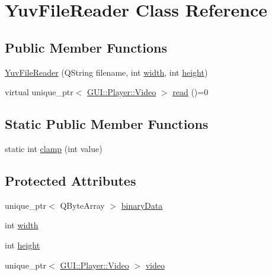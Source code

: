 \hypertarget{classUtility_1_1YuvFileReader}{}\section{Yuv\+File\+Reader Class Reference}
\label{classUtility_1_1YuvFileReader}
\subsection*{Public Member Functions}
\begin{DoxyCompactItemize}
\item 
\hyperlink{classUtility_1_1YuvFileReader_a4d1117a96eef85d154a837df5779e21a}{Yuv\+File\+Reader} (Q\+String filename, int \hyperlink{classUtility_1_1YuvFileReader_a2474a5474cbff19523a51eb1de01cda4}{width}, int \hyperlink{classUtility_1_1YuvFileReader_ad12fc34ce789bce6c8a05d8a17138534}{height})
\item 
virtual unique\+\_\+ptr$<$ \hyperlink{classGUI_1_1Player_1_1Video}{G\+U\+I\+::\+Player\+::\+Video} $>$ \hyperlink{classUtility_1_1YuvFileReader_abc1ed29027875586a65ee627201343d4}{read} ()=0
\end{DoxyCompactItemize}
\subsection*{Static Public Member Functions}
\begin{DoxyCompactItemize}
\item 
static int \hyperlink{classUtility_1_1YuvFileReader_ae73346d00388350396fd2185ca80dfb8}{clamp} (int value)
\end{DoxyCompactItemize}
\subsection*{Protected Attributes}
\begin{DoxyCompactItemize}
\item 
unique\+\_\+ptr$<$ Q\+Byte\+Array $>$ \hyperlink{classUtility_1_1YuvFileReader_aa6f0d985e2603aa538ffa615b26c0b4d}{binary\+Data}
\item 
int \hyperlink{classUtility_1_1YuvFileReader_a2474a5474cbff19523a51eb1de01cda4}{width}
\item 
int \hyperlink{classUtility_1_1YuvFileReader_ad12fc34ce789bce6c8a05d8a17138534}{height}
\item 
unique\+\_\+ptr$<$ \hyperlink{classGUI_1_1Player_1_1Video}{G\+U\+I\+::\+Player\+::\+Video} $>$ \hyperlink{classUtility_1_1YuvFileReader_a116c92e009352d894f8d0f608109ebe9}{video}
\end{DoxyCompactItemize}


